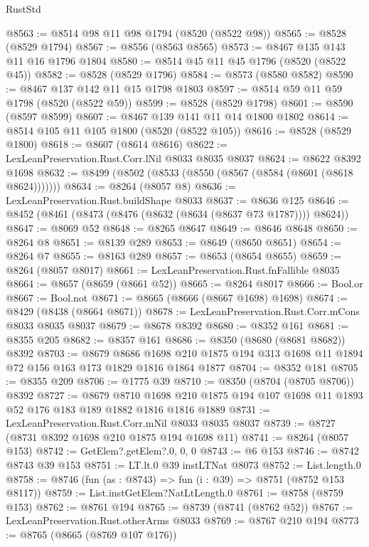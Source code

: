 \begin{lexlean}{RustStd}
\begin{coremodule}
{\begin{coremodule}
{{{{{{{{{{{{{{{{{{{{{{{{{{{{{{{{{{{{{{{{{{{{{{{@8563 := @8514 @98 @11 @98 @1794 (@8520 (@8522 @98))
@8565 := @8528 (@8529 @1794)
@8567 := @8556 (@8563 @8565)
@8573 := @8467 @135 @143 @11 @16 @1796 @1804
@8580 := @8514 @45 @11 @45 @1796 (@8520 (@8522 @45))
@8582 := @8528 (@8529 @1796)
@8584 := @8573 (@8580 @8582)
@8590 := @8467 @137 @142 @11 @15 @1798 @1803
@8597 := @8514 @59 @11 @59 @1798 (@8520 (@8522 @59))
@8599 := @8528 (@8529 @1798)
@8601 := @8590 (@8597 @8599)
@8607 := @8467 @139 @141 @11 @14 @1800 @1802
@8614 := @8514 @105 @11 @105 @1800 (@8520 (@8522 @105))
@8616 := @8528 (@8529 @1800)
@8618 := @8607 (@8614 @8616)
@8622 := LexLeanPreservation.Rust.Corr.lNil @8033 @8035 @8037
@8624 := @8622 @8392 @1698
@8632 := @8499 (@8502 (@8533 (@8550 (@8567 (@8584 (@8601 (@8618 @8624)))))))
@8634 := @8264 (@8057 @8)
@8636 := LexLeanPreservation.Rust.buildShape @8033
@8637 := @8636 @125
@8646 := @8452 (@8461 (@8473 (@8476 (@8632 (@8634 (@8637 @73 @1787)))) @8624))
@8647 := @8069 @52
@8648 := @8265 @8647
@8649 := @8646 @8648
@8650 := @8264 @8
@8651 := @8139 @289
@8653 := @8649 (@8650 @8651)
@8654 := @8264 @7
@8655 := @8163 @289
@8657 := @8653 (@8654 @8655)
@8659 := @8264 (@8057 @8017)
@8661 := LexLeanPreservation.Rust.fnFallible @8035
@8664 := @8657 (@8659 (@8661 @52))
@8665 := @8264 @8017
@8666 := Bool.or
@8667 := Bool.not
@8671 := @8665 (@8666 (@8667 @1698) @1698)
@8674 := @8429 (@8438 (@8664 @8671))
@8678 := LexLeanPreservation.Rust.Corr.mCons @8033 @8035 @8037
@8679 := @8678 @8392
@8680 := @8352 @161
@8681 := @8355 @205
@8682 := @8357 @161
@8686 := @8350 (@8680 (@8681 @8682)) @8392
@8703 := @8679
    @8686
    @1698
    @210
    @1875
    @194
    @313
    @1698
    @11
    @1894
    @72
    @156
    @163
    @173
    @1829
    @1816
    @1864
    @1877
@8704 := @8352 @181
@8705 := @8355 @209
@8706 := @1775 @39
@8710 := @8350 (@8704 (@8705 @8706)) @8392
@8727 := @8679
    @8710
    @1698
    @210
    @1875
    @194
    @107
    @1698
    @11
    @1893
    @52
    @176
    @183
    @189
    @1882
    @1816
    @1816
    @1889
@8731 := LexLeanPreservation.Rust.Corr.mNil @8033 @8035 @8037
@8739 := @8727 (@8731 @8392 @1698 @210 @1875 @194 @1698 @11)
@8741 := @8264 (@8057 @153)
@8742 := GetElem?.getElem?.{0, 0, 0}
@8743 := @6 @153
@8746 := @8742 @8743 @39 @153
@8751 := LT.lt.{0} @39 instLTNat @8073
@8752 := List.length.{0}
@8758 := @8746 (fun (as : @8743) => fun (i : @39) => @8751 (@8752 @153 @8117))
@8759 := List.instGetElem?NatLtLength.{0}
@8761 := @8758 (@8759 @153)
@8762 := @8761 @194
@8765 := @8739 (@8741 (@8762 @52))
@8767 := LexLeanPreservation.Rust.otherArms @8033
@8769 := @8767 @210 @194
@8773 := @8765 (@8665 (@8769 @107 @176))
}}}}}}}}}}}}}}}}}}}}}}}}}}}}}}}}}}}}}}}}}}}}}}}
\end{coremodule}}
\end{coremodule}
\end{lexlean}
